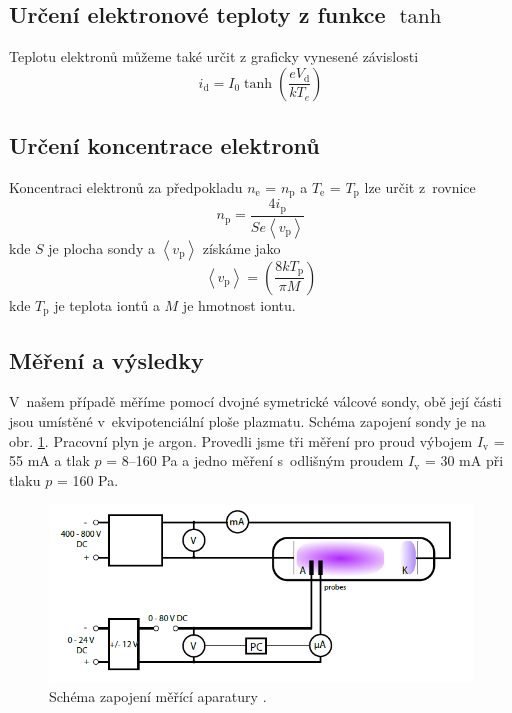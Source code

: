 \documentclass[a4paper,12pt]{article}
\begin{document}
\subsection{Určení elektronové teploty z funkce $\tanh$}
Teplotu elektronů můžeme také určit z graficky
vynesené závislosti
\begin{equation}
	i_\text{{d}} = I_0 \tanh\left( \frac{e V_\text{{d}} }{k T_e} \right) 
	\label{tanh}
\end{equation}

\subsection{Určení koncentrace elektronů}
Koncentraci elektronů za předpokladu $n_\text{{e}}$ = $n_\text{{p}}$
a $T_\text{{e}}$ = $T_\text{{p}}$
lze určit z~rovnice
\begin{equation}
	n_\text{{p}} = \frac{4  i_\text{{p}}}{S e \left\langle v_\text{{p}} 
	\right\rangle }
	\label{ne}
\end{equation}
kde $S$ je plocha sondy a $\left\langle  v_\text{{p}} \right\rangle$ získáme jako
\begin{equation}
	\left\langle v_\text{{p}} \right\rangle = \left( \frac{8 kT_\text{{p}}}{\pi 
	M} \right) 
	\label{vp}
\end{equation}
kde $T_\text{p}$ je teplota iontů a $M$ je hmotnost iontu.

\subsection{Měření a výsledky}
V~našem případě měříme pomocí dvojné symetrické válcové sondy,
obě její části jsou umístěné v~ekvipotenciální ploše plazmatu.
Schéma zapojení sondy je na obr. \ref{zapojenidvojna}. Pracovní
plyn je argon. Provedli jsme tři měření pro proud výbojem  $I_\text{{v}}$ =
55 \si{\milli\ampere} a tlak $p$ = 8--160 \si{\pascal} a jedno
měření s~odlišným proudem $I_\text{{v}}$ =
30 \si{\milli\ampere} při tlaku $p$ = 160 \si{\pascal}.

\begin{figure}[h]
	\centering
	\includegraphics[width=130mm]{zapojenidvojna.png}
	\caption{Schéma zapojení měřící aparatury \cite{navod}.}
	\label{zapojenidvojna}
\end{figure}
\end{document}
